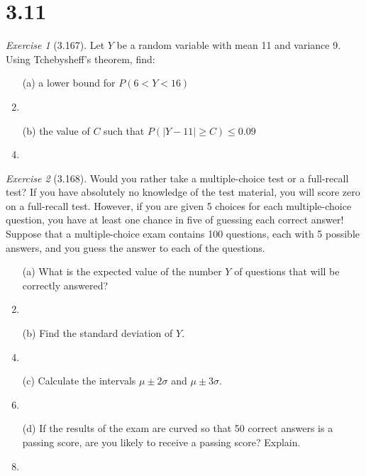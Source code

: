 \documentclass[12pt]{amsart}
\makeatletter
\theoremstyle{remark}
\newtheorem*{exercise}{Exercise}%
\renewenvironment{proof}[1][\proofname]{\par\doublespacing
  \pushQED{\qed}%
  \normalfont \topsep6\p@\@plus6\p@\relax
  \list{}{%
    \settowidth{\leftmargin}{\itshape\proofname:\hskip\labelsep}%
    \setlength{\labelwidth}{0pt}%
    \setlength{\itemindent}{-\leftmargin}%
  }%
  \item[\hskip\labelsep\itshape#1\@addpunct{:}]\ignorespaces
}{%
  \popQED\endlist\@endpefalse
  \singlespacing
}
\theoremstyle{mycomment}
\makeatother
\begin{document}
\section*{3.11}

\begin{exercise}[3.167]
Let $Y$ be a random variable with mean 11 and variance 9. Using Tchebysheff's theorem, find:

\begin{enumerate}
    \item[(a)] a lower bound for $P(6 < Y < 16)$
\begin{proof}[Solution]
 
\end{proof}
    \item[(b)] the value of $C$ such that $P(|Y - 11| \geq C) \leq 0.09$
\begin{proof}[Solution]
 
\end{proof}
\end{enumerate} 
\end{exercise}

\begin{exercise}[3.168]
Would you rather take a multiple-choice test or a full-recall test? If you have absolutely no knowledge of the test material, you will score zero on a full-recall test. However, if you are given 5 choices for each multiple-choice question, you have at least one chance in five of guessing each correct answer! Suppose that a multiple-choice exam contains 100 questions, each with 5 possible answers, and you guess the answer to each of the questions.

\begin{enumerate}
    \item[(a)] What is the expected value of the number $Y$ of questions that will be correctly answered?
\begin{proof}[Solution]
 
\end{proof}
    \item[(b)] Find the standard deviation of $Y$.
\begin{proof}[Solution]
 
\end{proof}
    \item[(c)] Calculate the intervals $\mu \pm 2\sigma$ and $\mu \pm 3\sigma$.
\begin{proof}[Solution]
 
\end{proof}
    \item[(d)] If the results of the exam are curved so that 50 correct answers is a passing score, are you likely to receive a passing score? Explain.
\begin{proof}[Solution]
 
\end{proof}
\end{enumerate} 
\end{exercise}
\end{document}
